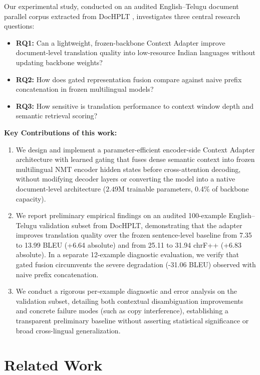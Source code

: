 \documentclass[conference]{IEEEtran}
\begin{document}
Our experimental study, conducted on an audited English--Telugu document parallel corpus extracted from DocHPLT \cite{obrien2025dochplt}, investigates three central research questions:
\begin{itemize}
    \item \textbf{RQ1:} Can a lightweight, frozen-backbone Context Adapter improve document-level translation quality into low-resource Indian languages without updating backbone weights?
    \item \textbf{RQ2:} How does gated representation fusion compare against naive prefix concatenation in frozen multilingual models?
    \item \textbf{RQ3:} How sensitive is translation performance to context window depth and semantic retrieval scoring?
\end{itemize}

\noindent\textbf{Key Contributions of this work:}
\begin{enumerate}
    \item We design and implement a parameter-efficient encoder-side Context Adapter architecture with learned gating that fuses dense semantic context into frozen multilingual NMT encoder hidden states before cross-attention decoding, without modifying decoder layers or converting the model into a native document-level architecture ($2.49\text{M}$ trainable parameters, 0.4\% of backbone capacity).
    \item We report preliminary empirical findings on an audited 100-example English--Telugu validation subset from DocHPLT, demonstrating that the adapter improves translation quality over the frozen sentence-level baseline from 7.35 to 13.99 BLEU (+6.64 absolute) and from 25.11 to 31.94 chrF++ (+6.83 absolute). In a separate 12-example diagnostic evaluation, we verify that gated fusion circumvents the severe degradation (-31.06 BLEU) observed with naive prefix concatenation.
    \item We conduct a rigorous per-example diagnostic and error analysis on the validation subset, detailing both contextual disambiguation improvements and concrete failure modes (such as copy interference), establishing a transparent preliminary baseline without asserting statistical significance or broad cross-lingual generalization.
\end{enumerate}

\section{Related Work}
\label{sec:related_work}
\end{document}
